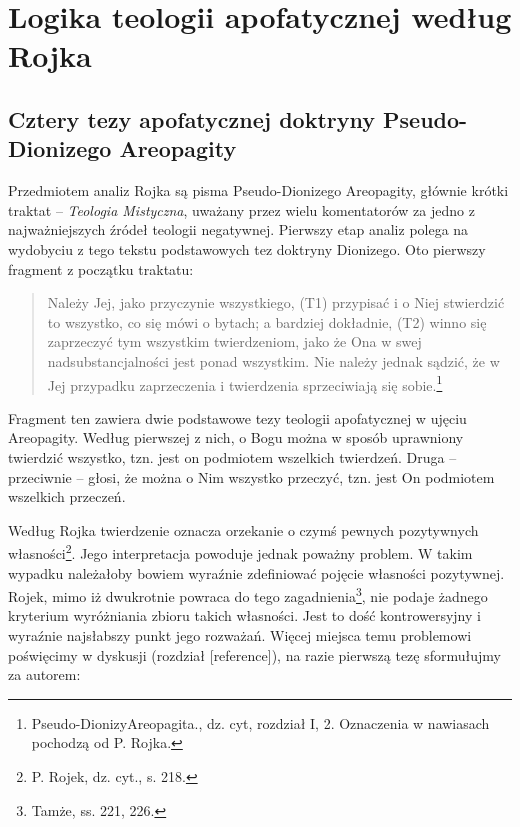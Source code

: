 

\chapter{Logika teologii apofatycznej według Rojka}

\section{Cztery tezy apofatycznej doktryny Pseudo-Dionizego Areopagity}

Przedmiotem analiz Rojka są pisma Pseudo-Dionizego Areopagity, głównie
krótki traktat -- \textit{Teologia Mistyczna}, uważany przez wielu
komentatorów za jedno z najważniejszych źródeł teologii negatywnej.
Pierwszy etap analiz polega na wydobyciu z tego tekstu podstawowych tez
doktryny Dionizego. Oto pierwszy fragment z początku traktatu:

\begin{quote}
    Należy Jej, jako przyczynie wszystkiego, (T1) przypisać i o Niej
stwierdzić to wszystko, co się mówi o bytach; a bardziej dokładnie,
(T2) winno się zaprzeczyć tym wszystkim twierdzeniom, jako że Ona w
swej nadsubstancjalności jest ponad wszystkim. Nie należy jednak
sądzić, że w Jej przypadku zaprzeczenia i twierdzenia sprzeciwiają się
sobie.\footnote{Pseudo-DionizyAreopagita., dz. cyt, rozdział I, 2.
Oznaczenia w nawiasach pochodzą od P. Rojka.}
\end{quote}





Fragment ten zawiera dwie podstawowe tezy teologii apofatycznej w ujęciu
Areopagity. Według pierwszej z nich, o Bogu można w sposób uprawniony
twierdzić wszystko, tzn. jest on podmiotem wszelkich twierdzeń. Druga –
przeciwnie -- głosi, że można o Nim wszystko przeczyć, tzn. jest On
podmiotem wszelkich przeczeń.

Według Rojka twierdzenie oznacza orzekanie o czymś pewnych pozytywnych
własności\footnote{P. Rojek, dz. cyt., s. 218. }. Jego
interpretacja powoduje jednak poważny problem. W takim wypadku
należałoby bowiem wyraźnie zdefiniować pojęcie własności pozytywnej.
Rojek, mimo iż dwukrotnie powraca do tego zagadnienia\footnote{Tamże,
ss. 221, 226. }, nie podaje żadnego kryterium wyróżniania zbioru
takich własności. Jest to dość kontrowersyjny i wyraźnie najsłabszy
punkt jego rozważań. Więcej miejsca temu problemowi poświęcimy w
dyskusji (rozdział [reference]), na razie pierwszą tezę sformułujmy za
autorem:


